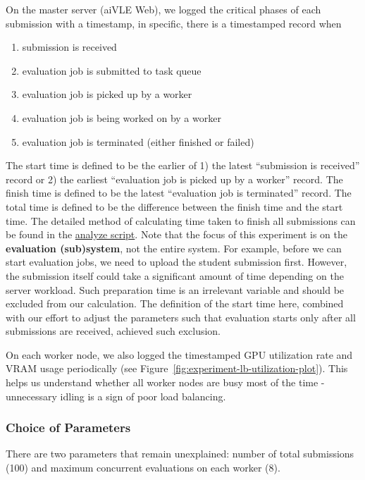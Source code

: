 On the master server (aiVLE Web), we logged the critical phases of each submission with a timestamp, in specific, there is a timestamped record when
\begin{enumerate}
    \item submission is received
    \item evaluation job is submitted to task queue
    \item evaluation job is picked up by a worker
    \item evaluation job is being worked on by a worker
    \item evaluation job is terminated (either finished or failed)
\end{enumerate}

The start time is defined to be the earlier of 1) the latest ``submission is received'' record or 2) the earliest ``evaluation job is picked up by a worker'' record. The finish time is defined to be the latest ``evaluation job is terminated'' record. The total time is defined to be the difference between the finish time and the start time. The detailed method of calculating time taken to finish all submissions can be found in the \href{https://github.com/edu-ai/aivle-experiment-logs/blob/main/web/analyze.ipynb}{analyze script}. Note that the focus of this experiment is on the \textbf{evaluation (sub)system}, not the entire system. For example, before we can start evaluation jobs, we need to upload the student submission first. However, the submission itself could take a significant amount of time depending on the server workload. Such preparation time is an irrelevant variable and should be excluded from our calculation. The definition of the start time here, combined with our effort to adjust the parameters such that evaluation starts only after all submissions are received, achieved such exclusion.

On each worker node, we also logged the timestamped GPU utilization rate and VRAM usage periodically (see Figure~\ref{fig:experiment-lb-utilization-plot}). This helps us understand whether all worker nodes are busy most of the time - unnecessary idling is a sign of poor load balancing.

\subsubsection{Choice of Parameters}
\label{sss:choice-of-params}

There are two parameters that remain unexplained: number of total submissions (100) and maximum concurrent evaluations on each worker (8).

